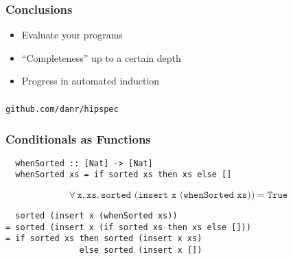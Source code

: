 \documentclass[serif,professionalfont]{beamer}
\newcommand\faa[2]{ \forall \, #1 , #2 . \,}
\newcommand\hs[1]{\texttt{#1}}
\newcommand\xs[0]{\hs{xs}}
\begin{document}


\begin{frame}
  \frametitle{Conclusions}
  \begin{itemize}
    \item Evaluate your programs
    \pause
    \item ``Completeness'' up to a certain depth
    \pause
    \item Progress in automated induction
  \end{itemize}
\end{frame}

\begin{frame}
\frametitle{}
\begin{center}
\hs{github.com/danr/hipspec}
\end{center}
\end{frame}

\begin{frame}[fragile]
  \frametitle{Conditionals as Functions}

  \insertlemma

\begin{verbatim}
  whenSorted :: [Nat] -> [Nat]
  whenSorted xs = if sorted xs then xs else []
\end{verbatim}

  \begin{equation*}
    \faa{\hs{x}}{\xs} \hs{sorted (insert x (whenSorted xs))} = \hs{True}
  \end{equation*}

\pause

\begin{verbatim}
  sorted (insert x (whenSorted xs))
= sorted (insert x (if sorted xs then xs else []))
= if sorted xs then sorted (insert x xs)
               else sorted (insert x [])
\end{verbatim}

\end{frame}
\end{document}
